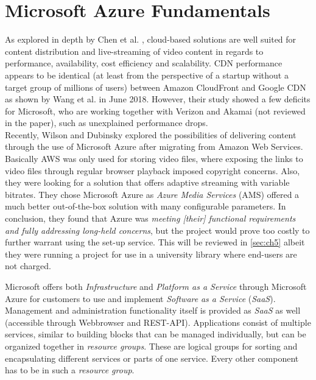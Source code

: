 \section{Microsoft Azure Fundamentals}\label{sec:ch2}
As explored in depth by Chen et al. \cite{chen2015crowdsourced}, cloud-based solutions are
well suited for content distribution and live-streaming of video content in regards to  
performance, availability, cost efficiency and scalability. 
CDN performance appears to be identical (at least from the perspective of a startup without a target group 
of millions of users) between Amazon CloudFront and Google CDN as shown by Wang et al.  
\cite{wang2018comparing} in June 2018. However, their study showed a few deficits for Microsoft, who are working 
together with Verizon and Akamai (not reviewed in the paper), such as unexplained performance drops. \\ %
Recently, Wilson and Dubinsky explored the possibilities of delivering content through the use of Microsoft
Azure after migrating from Amazon Web Services. \cite{wilson2018piloting} Basically AWS was only used for 
storing video files, where exposing the links to video files through regular browser playback imposed 
copyright concerns. Also, they were looking for a solution that offers adaptive streaming with variable 
bitrates. %
They chose Microsoft Azure as \textit{Azure Media Services} (AMS) offered a much better out-of-the-box solution 
with many configurable parameters.
In conclusion, they found that Azure was \glqq\textit{meeting [their] functional requirements and fully addressing
long-held concerns}\grqq, but the project would prove too costly to further warrant using the set-up service. This will be reviewed in \ref{sec:ch5} albeit they were running a project for use in a university library where end-users are not charged.

Microsoft offers both \textit{Infrastructure} and \textit{Platform as a 
Service} through Microsoft Azure for customers to use and implement \textit{Software} \textit{as
a Service} (\textit{SaaS}). Management and administration functionality itself is provided as \textit{SaaS} as well (accessible through Webbrowser and REST-API). 
Applications consist of multiple services, similar to
\glqq building blocks\grqq{} that can be managed individually, but can be organized 
together in \textit{resource groups}. These are logical groups for sorting and 
encapsulating different services or parts of one service. Every other component
has to be in such a \textit{resource group}.

